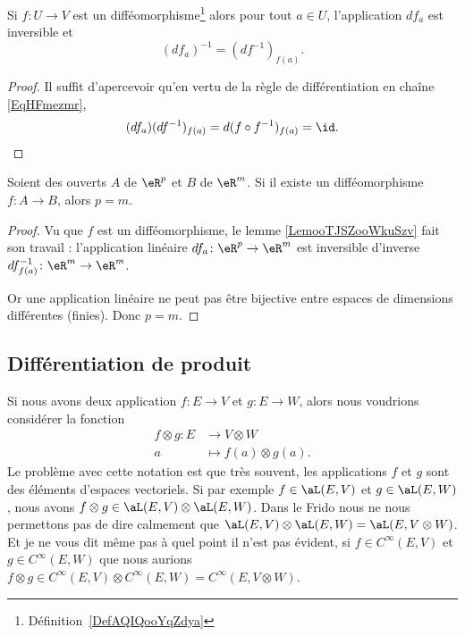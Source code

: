 \begin{lemma}       \label{LemooTJSZooWkuSzv}
    Si \( f\colon U\to V\) est un difféomorphisme\footnote{Définition~\ref{DefAQIQooYqZdya}} alors pour tout \( a\in U\), l'application \( df_a\) est inversible et
    \begin{equation}
        (df_a)^{-1}=(df^{-1})_{f(a)}.
    \end{equation}
\end{lemma}

\begin{proof}
    Il suffit d'apercevoir qu'en vertu de la règle de différentiation en chaîne \eqref{EqHFmezmr},
    \begin{equation}
        (df_a)(df^{-1})_{f(a)}=d(f\circ f^{-1})_{f(a)}=\id.
    \end{equation}
\end{proof}

\begin{proposition}     \label{PROPooNONAooCyAtce}
    Soient des ouverts \( A\) de \( \eR^p\) et \( B\) de \( \eR^m\). Si il existe un difféomorphisme \( f\colon A\to B\), alors \( p=m\).
\end{proposition}

\begin{proof}
    Vu que \( f\) est un difféomorphisme, le lemme \ref{LemooTJSZooWkuSzv} fait son travail : l'application linéaire \( df_a\colon \eR^p\to \eR^m\) est inversible d'inverse \( df^{-1}_{f(a)}\colon \eR^m\to \eR^m\).

    Or une application linéaire ne peut pas être bijective entre espaces de dimensions différentes (finies). Donc \( p=m\).
\end{proof}

\subsection{Différentiation de produit}

Si nous avons deux application \( f\colon E\to V\) et \( g\colon E\to W\), alors nous voudrions considérer la fonction
\begin{equation}
    \begin{aligned}
        f\otimes g\colon E&\to V\otimes W \\
        a&\mapsto f(a)\otimes g(a). 
    \end{aligned}
\end{equation}
Le problème avec cette notation est que très souvent, les applications \( f\) et \( g\) sont des éléments d'espaces vectoriels. Si par exemple \( f\in \aL(E,V)\) et \( g\in \aL(E,W)\), nous avons \( f\otimes g\in \aL(E,V)\otimes \aL(E,W)\). Dans le Frido nous ne nous permettons pas de dire calmement que \( \aL(E,V)\otimes \aL(E,W)=\aL(E,V\otimes W)\). Et je ne vous dit même pas à quel point il n'est pas évident, si \( f\in C^{\infty}(E,V)\) et \( g\in  C^{\infty}(E,W)\) que nous aurions \( f\otimes g\in C^{\infty}(E,V)\otimes  C^{\infty}(E,W)= C^{\infty}(E,V\otimes W)\).

